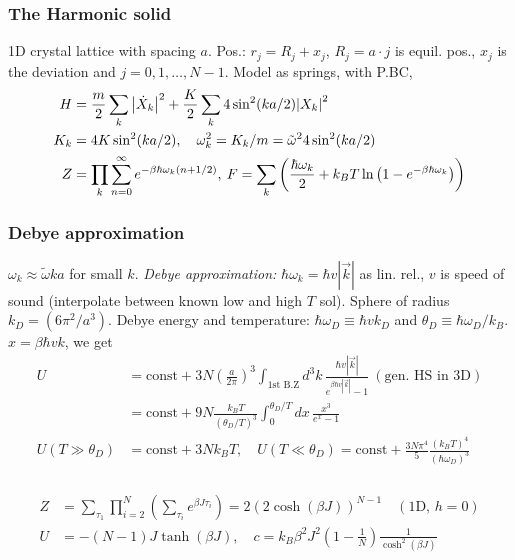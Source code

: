 \documentclass[a4paper, english, 12pt]{article}
\newcommand{\closed}[1]{\left( #1 \right)}
\begin{document}
\begin{multicols*}{2}
\subsubsection*{\scriptsize The Harmonic solid}
1D crystal lattice with spacing $a$. Pos.: $r_j = R_j + x_j$, $R_j=a\cdot j$ is equil. pos., $x_j$ is the deviation and $j=0,1,\dots,N-1$. Model as springs, with P.BC, 
\begin{align*}
    H &= \frac{m}{2} \sum_k \abs{\dot{X}_k}^2 + \frac{K}{2} \sum_k 4\sin^2(ka/2) \abs{X_k}^2 \\
    K_k &= 4K \sin^2(ka/2),\quad \omega_k^2 = K_k/m = \tilde{\omega}^2 4\sin^2(ka/2) \\
    Z &= \prod_k \sum_{n=0}^\infty e^{-\beta \hbar \omega_k (n+1/2)},\: F= \sum_k \closed{\frac{\hbar \omega_k}{2} + k_B T \ln\closed{1-e^{-\beta \hbar \omega_k}} } \\
\end{align*}


\subsubsection*{\scriptsize Debye approximation}

$\omega_k\approx \tilde{\omega} ka$ for small $k$. \textit{Debye approximation:} $\hbar\omega_k=\hbar v |\vec{k}|$ as lin. rel., $v$ is speed of sound (interpolate between known low and high $T$ sol). Sphere of radius $k_D=(6\pi^2/a^3)$. Debye energy and temperature: $\hbar \omega_D\equiv \hbar v k_D$ and $\theta_D\equiv \hbar \omega_D/k_B$. $x=\beta\hbar v k$, we get 
\begin{align*}
    U &= \text{const} + 3N\closed{\frac{a}{2\pi}}^3 \int_{\text{1st B.Z}} d^3 k\,\frac{\hbar v |\vec{k}|}{e^{\beta\hbar v |\vec{k}|} - 1}\:(\text{gen. HS in 3D}) \\ 
    &= \text{const} + 9N \frac{k_B T}{(\theta_D / T)^3} \int_0^{\theta_D / T} dx\, \frac{x^3}{e^x - 1} \\
    U(T\gg\theta_D) & = \text{const} + 3N k_B T,\quad  U(T\ll\theta_D) = \text{const} + \frac{3N\pi^4}{5} \frac{(k_B T)^4}{(\hbar\omega_D)^3} 
\end{align*}


\subsubsection*{}
\begin{align*}
    Z &= \sum_{\tau_1} \prod_{i=2}^N \closed{\sum_{\tau_i} e^{\beta J \tau_i}} = 2(2\cosh(\beta J))^{N-1}\quad (\text{1D, } h=0) \\ 
    U &= -(N-1)J\tanh(\beta J),\quad c = k_B \beta^2 J^2 \closed{1-\frac{1}{N}} \frac{1}{\cosh^2(\beta J)}
\end{align*} 



\end{multicols*}
\end{document}
